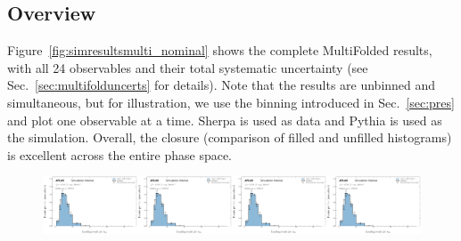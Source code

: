 \label{sec:resultsMulti}

\subsection{Overview}

Figure~\ref{fig:simresultsmulti_nominal} shows the complete MultiFolded results, with all 24 observables and their total systematic uncertainty (see Sec.~\ref{sec:multifolduncerts} for details).  Note that the results are unbinned and simultaneous, but for illustration, we use the binning introduced in Sec.~\ref{sec:pres} and plot one observable at a time.  Sherpa is used as data and Pythia is used as the simulation.  Overall, the closure (comparison of filled and unfilled histograms) is excellent across the entire phase space.

\begin{figure}[h!]
\centering
\includegraphics[width=0.25\textwidth,page=1]{figures/SimResults/MultiFoldTotalErrors.pdf}\includegraphics[width=0.25\textwidth,page=2]{figures/SimResults/MultiFoldTotalErrors.pdf}\includegraphics[width=0.25\textwidth,page=3]{figures/SimResults/MultiFoldTotalErrors.pdf}\includegraphics[width=0.25\textwidth,page=4]{figures/SimResults/MultiFoldTotalErrors.pdf}\\

\end{figure}
